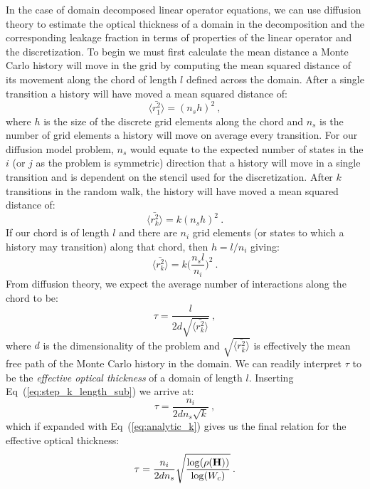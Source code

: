 In the case of domain decomposed linear operator equations, we can use
diffusion theory to estimate the optical thickness of a domain in the
decomposition and the corresponding leakage fraction in terms of
properties of the linear operator and the discretization. To begin we
must first calculate the mean distance a Monte Carlo history will move
in the grid by computing the mean squared distance of its movement
along the chord of length $l$ defined across the domain. After a
single transition a history will have moved a mean squared distance
of:
\begin{equation}
  \langle \bar{r_1^2} \rangle = (n_s h)^2\:,
  \label{eq:step_1_length}
\end{equation}
where $h$ is the size of the discrete grid elements along the chord
and $n_s$ is the number of grid elements a history will move on
average every transition. For our diffusion model problem, $n_s$ would
equate to the expected number of states in the $i$ (or $j$ as the problem is
symmetric) direction that a history will move in a single
transition and is dependent on the stencil used for the
discretization. After $k$ transitions in the random walk, the history
will have moved a mean squared distance of:
\begin{equation}
  \langle \bar{r_k^2} \rangle = k (n_s h)^2\:.
  \label{eq:step_k_length}
\end{equation}
If our chord is of length $l$ and there are $n_i$ grid elements (or
states to which a history may transition) along that chord, then $h =
l / n_i$ giving:
\begin{equation}
  \langle \bar{r_k^2} \rangle = k \Bigg(\frac{n_s l}{n_i}\Bigg)^2\:.
  \label{eq:step_k_length_sub}
\end{equation}
From diffusion theory, we expect the average number of interactions
along the chord to be:
\begin{equation}
  \tau = \frac{l}{2 d \sqrt{\langle \bar{r_k^2} \rangle}}\:,
  \label{eq:optical_thickness_1}
\end{equation}
where $d$ is the dimensionality of the problem and $\sqrt{\langle
  \bar{r_k^2} \rangle}$ is effectively the mean free path of the Monte
Carlo history in the domain. We can readily interpret $\tau$ to be the
\textit{effective optical thickness} of a domain of length
$l$. Inserting Eq~(\ref{eq:step_k_length_sub}) we arrive at:
\begin{equation}
  \tau = \frac{n_i}{2 d n_s \sqrt{k}}\:,
  \label{eq:optical_thickness_2}
\end{equation}
which if expanded with Eq~(\ref{eq:analytic_k}) gives us the final
relation for the effective optical thickness:
\begin{equation}
  \tau = \frac{n_i}{2 d n_s}
  \sqrt{\frac{\log(\rho(\mathbf{H}))}{\log(W_c)}}\:.
  \label{eq:optical_thickness_3}
\end{equation}

